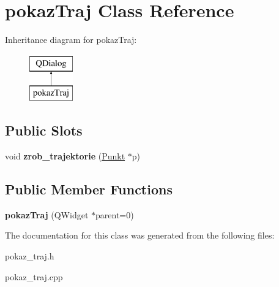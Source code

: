 \hypertarget{classpokaz_traj}{}\section{pokaz\+Traj Class Reference}
\label{classpokaz_traj}
Inheritance diagram for pokaz\+Traj\+:\begin{figure}[H]
\begin{center}
\leavevmode
\includegraphics[height=2.000000cm]{classpokaz_traj}
\end{center}
\end{figure}
\subsection*{Public Slots}
\begin{DoxyCompactItemize}
\item 
\mbox{\label{classpokaz_traj_a9789951ce1b3f9a34fac38976447c04e}} 
void {\bfseries zrob\+\_\+trajektorie} (\mbox{\hyperlink{struct_punkt}{Punkt}} $\ast$p)
\end{DoxyCompactItemize}
\subsection*{Public Member Functions}
\begin{DoxyCompactItemize}
\item 
\mbox{\label{classpokaz_traj_a30010467d8e1251d3b57762956962349}} 
{\bfseries pokaz\+Traj} (Q\+Widget $\ast$parent=0)
\end{DoxyCompactItemize}


The documentation for this class was generated from the following files\+:\begin{DoxyCompactItemize}
\item 
pokaz\+\_\+traj.\+h\item 
pokaz\+\_\+traj.\+cpp\end{DoxyCompactItemize}
